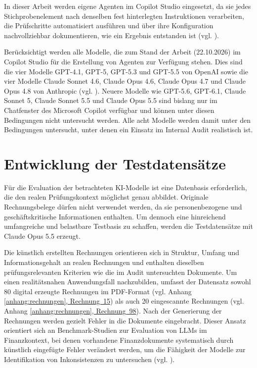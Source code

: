 In dieser Arbeit werden eigene Agenten im Copilot Studio eingesetzt, da sie jedes Stichprobenelement nach denselben fest hinterlegten Instruktionen verarbeiten, die Prüfschritte automatisiert ausführen und über ihre Konfiguration nachvollziehbar dokumentieren, wie ein Ergebnis entstanden ist (vgl. \cite[S.~4, 20]{schreyer2024agentic}).

Berücksichtigt werden alle Modelle, die zum Stand der Arbeit (22.10.2026) im Copilot Studio für die Erstellung von Agenten zur Verfügung stehen. Dies sind die vier Modelle GPT-4.1, GPT-5, GPT-5.3 und GPT-5.5 von OpenAI sowie die vier Modelle Claude Sonnet 4.6, Claude Opus 4.6, Claude Opus 4.7 und Claude Opus 4.8 von Anthropic (vgl. \cite{freudenberg2026copilot}). Neuere Modelle wie GPT-5.6, GPT-6.1, Claude Sonnet 5, Claude Sonnet 5.5 und Claude Opus 5.5 sind bislang nur im Chatfenster des Microsoft Copilot verfügbar und können unter diesen Bedingungen nicht untersucht werden. Alle acht Modelle werden damit unter den Bedingungen untersucht, unter denen ein Einsatz im Internal Audit realistisch ist.


\section{Entwicklung der Testdatensätze}
\label{sec:testdatensaetze}

Für die Evaluation der betrachteten \ac{KI}-Modelle ist eine Datenbasis erforderlich, die den realen Prüfungskontext möglichst genau abbildet. Originale Rechnungsbelege dürfen nicht verwendet werden, da sie personenbezogene und geschäftskritische Informationen enthalten. Um dennoch eine hinreichend umfangreiche und belastbare Testbasis zu schaffen, werden die Testdatensätze mit Claude Opus 5.5 erzeugt.

Die künstlich erstellten Rechnungen orientieren sich in Struktur, Umfang und Informationsgehalt an realen Rechnungen und enthalten dieselben prüfungsrelevanten Kriterien wie die im Audit untersuchten Dokumente. Um einen realitätsnahen Anwendungsfall nachzubilden, umfasst der Datensatz sowohl 80 digital erzeugte Rechnungen im PDF-Format (vgl. Anhang \hyperref[anhang:rechnung-15]{\ref*{anhang:rechnungen}, Rechnung~15}) als auch 20 eingescannte Rechnungen (vgl. Anhang \hyperref[anhang:rechnung-98]{\ref*{anhang:rechnungen}, Rechnung~98}). Nach der Generierung der Rechnungen werden gezielt Fehler in die Dokumente eingebracht. Dieser Ansatz orientiert sich an Benchmark-Studien zur Evaluation von \acp{LLM} im Finanzkontext, bei denen vorhandene Finanzdokumente systematisch durch künstlich eingefügte Fehler verändert werden, um die Fähigkeit der Modelle zur Identifikation von Inkonsistenzen zu untersuchen (vgl. \cite[S.~1]{Panda2026FinVerBench}).

